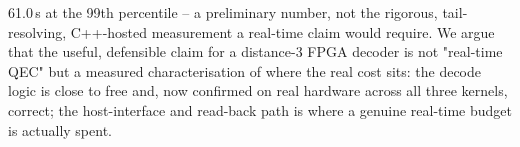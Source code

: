 61.0\,\textmu{}s at the 99th percentile -- a preliminary number, not the rigorous, tail-resolving, C++-hosted measurement a real-time claim would require. We argue that the useful, defensible claim for a distance-3 FPGA decoder is not "real-time QEC" but a measured characterisation of where the real cost sits: the decode logic is close to free and, now confirmed on real hardware across all three kernels, correct; the host-interface and read-back path is where a genuine real-time budget is actually spent.
